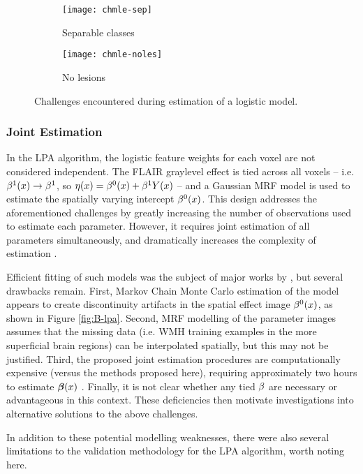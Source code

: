 \begin{figure}
  \centering
  \begin{subfigure}{\plotwidth}
    \texttt{[image: chmle-sep]}\caption{Separable classes}\label{fig:chmle-sep}
  \end{subfigure}
  \begin{subfigure}{\plotwidth}
    \texttt{[image: chmle-noles]}\caption{No lesions}\label{fig:chmle-noles}
  \end{subfigure}
  \caption{Challenges encountered during estimation of a logistic model.}
  \label{fig:chmle}
\end{figure}
\subsubsection{Joint Estimation}
In the LPA algorithm, the logistic feature weights for each voxel are not considered independent. The FLAIR graylevel effect is tied across all voxels -- i.e. $\beta^1(x) \rightarrow \beta^1$, so $\eta(x) = \beta^0(x) + \beta^1Y(x)$ -- and a Gaussian MRF model is used to estimate the spatially varying intercept $\beta^0(x)$. This design addresses the aforementioned challenges by greatly increasing the number of observations used to estimate each parameter. However, it requires joint estimation of all parameters simultaneously, and dramatically increases the complexity of estimation \cite{Schmidt2017a}.
\par
Efficient fitting of such models was the subject of major works by \citeauthor{Schmidt2017} \cite{Schmidt2017,Schmidt2017a}, but several drawbacks remain.
First, Markov Chain Monte Carlo estimation of the model appears to create discontinuity artifacts in the spatial effect image $\beta^0(x)$, as shown in Figure \ref{fig:B-lpa}.
Second, MRF modelling of the parameter images assumes that the missing data (i.e. WMH training examples in the more superficial brain regions) can be interpolated spatially, but this may not be justified.
Third, the proposed joint estimation procedures are computationally expensive (versus the methods proposed here), requiring approximately two hours to estimate $\bm{\beta}(x)$ \cite{Schmidt2017a}.
Finally, it is not clear whether any tied $\beta$ are necessary or advantageous in this context.
These deficiencies then motivate investigations into alternative solutions to the above challenges.
\par
In addition to these potential modelling weaknesses, there were also several limitations to the validation methodology for the LPA algorithm, worth noting here.
